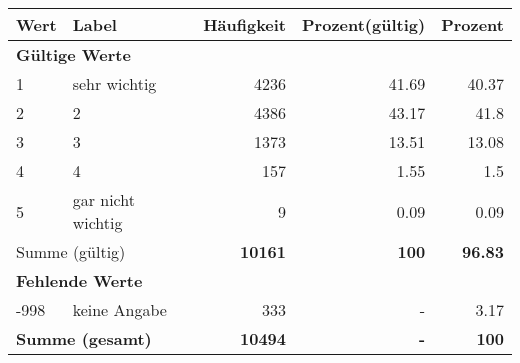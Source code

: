      \begin{longtable}{lXrrr}
     \toprule
     \textbf{Wert} & \textbf{Label} & \textbf{Häufigkeit} & \textbf{Prozent(gültig)} & \textbf{Prozent} \\
     \endhead
     \midrule
     \multicolumn{5}{l}{\textbf{Gültige Werte}}\\

     1 &
     \multicolumn{1}{X}{ sehr wichtig   } &


       \num{4236} &
       \num[round-mode=places,round-precision=2]{41.69} &
         \num[round-mode=places,round-precision=2]{40.37} \\

     2 &
     \multicolumn{1}{X}{ 2   } &


       \num{4386} &
       \num[round-mode=places,round-precision=2]{43.17} &
         \num[round-mode=places,round-precision=2]{41.8} \\

     3 &
     \multicolumn{1}{X}{ 3   } &


       \num{1373} &
       \num[round-mode=places,round-precision=2]{13.51} &
         \num[round-mode=places,round-precision=2]{13.08} \\

     4 &
     \multicolumn{1}{X}{ 4   } &


       \num{157} &
       \num[round-mode=places,round-precision=2]{1.55} &
         \num[round-mode=places,round-precision=2]{1.5} \\

     5 &
     \multicolumn{1}{X}{ gar nicht wichtig   } &


       \num{9} &
       \num[round-mode=places,round-precision=2]{0.09} &
         \num[round-mode=places,round-precision=2]{0.09} \\
     \midrule
     \multicolumn{2}{l}{Summe (gültig)} &
       \textbf{\num{10161}} &
     \textbf{\num{100}} &
       \textbf{\num[round-mode=places,round-precision=2]{96.83}} \\
     \multicolumn{5}{l}{\textbf{Fehlende Werte}}\\
       -998 &
       keine Angabe &
         \num{333} &
        - &
         \num[round-mode=places,round-precision=2]{3.17} \\
     \midrule
     \multicolumn{2}{l}{\textbf{Summe (gesamt)}} &
          \textbf{\num{10494}} &
        \textbf{-} &
        \textbf{\num{100}} \\
     \bottomrule
     \end{longtable}
     
